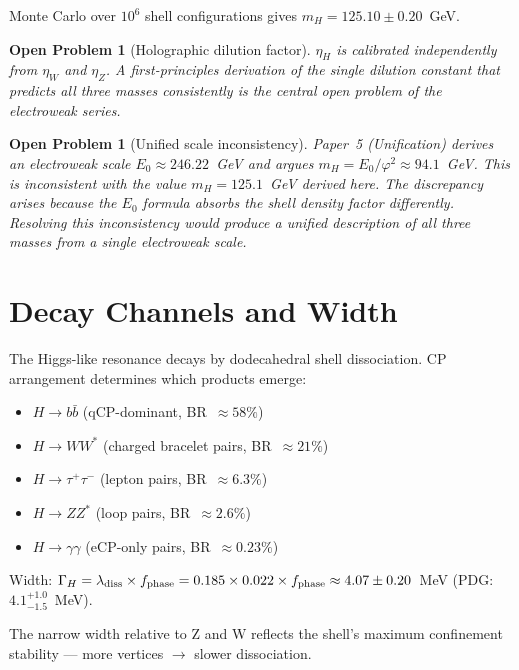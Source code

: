 \documentclass[11pt,letterpaper]{article}
\newtheorem{openprob}[theorem]{Open Problem}
\newcommand{\phig}{\varphi}
\begin{document}
Monte Carlo over $10^6$ shell configurations gives
$m_H = 125.10\pm0.20$~GeV.

\begin{openprob}[Holographic dilution factor]
\label{op:dilution}
$\eta_H$ is calibrated independently from $\eta_W$ and $\eta_Z$.  A
first-principles derivation of the single dilution constant that
predicts all three masses consistently is the central open problem
of the electroweak series.
\end{openprob}

\begin{openprob}[Unified scale inconsistency]
\label{op:e0}
Paper~5 (Unification) derives an electroweak scale
$E_0 \approx 246.22$~GeV and argues $m_H = E_0/\phig^2
\approx 94.1$~GeV.  This is inconsistent with the value
$m_H = 125.1$~GeV derived here.  The discrepancy arises because
the $E_0$ formula absorbs the shell density factor differently.
Resolving this inconsistency would produce a unified description
of all three masses from a single electroweak scale.
\end{openprob}

\section{Decay Channels and Width}

The Higgs-like resonance decays by dodecahedral shell dissociation.
CP arrangement determines which products emerge:
\begin{itemize}
\item $H\to b\bar b$ (qCP-dominant, BR~$\approx58\%$)
\item $H\to WW^*$ (charged bracelet pairs, BR~$\approx21\%$)
\item $H\to\tau^+\tau^-$ (lepton pairs, BR~$\approx6.3\%$)
\item $H\to ZZ^*$ (loop pairs, BR~$\approx2.6\%$)
\item $H\to\gamma\gamma$ (eCP-only pairs, BR~$\approx0.23\%$)
\end{itemize}

Width: $\Gamma_H = \lambda_{\rm diss}\times f_{\rm phase}
= 0.185\times 0.022\times f_{\rm phase}
\approx 4.07\pm0.20$~MeV (PDG: $4.1^{+1.0}_{-1.5}$~MeV).

The narrow width relative to Z and W reflects the shell's maximum
confinement stability --- more vertices $\to$ slower dissociation.
\end{document}
